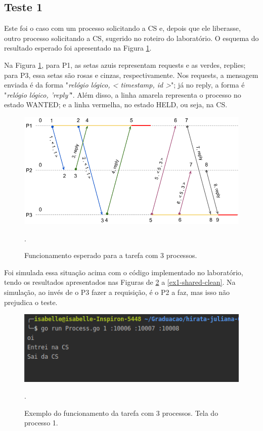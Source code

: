 \documentclass[conference]{IEEEtran}
\begin{document}
\subsection{Teste 1}

	Este foi o caso com um processo solicitando a CS e, depois que ele liberasse, outro processo solicitando a CS, sugerido no roteiro do laboratório. O esquema do resultado esperado foi apresentado na Figura \ref{ex1}.
	
	Na Figura \ref{ex1}, para P1, as setas azuis representam requests e as verdes, replies; para P3, essa setas são rosas e cinzas, respectivamente. Nos requests, a mensagem enviada é da forma "\textit{relógio lógico, < timestamp, id >}"; já no reply, a forma é "\textit{relógio lógico, 'reply'}". Além disso, a linha amarela representa o processo no estado WANTED; e a linha vermelha, no estado HELD, ou seja, na CS.
	
\begin{figure}[H]
\centering
\centerline{\includegraphics[scale=0.3]{imagens/ex1.png}}
\caption{Funcionamento esperado para a tarefa com 3 processos.}.
\label{ex1}
\end{figure}

	Foi simulada essa situação acima com o código implementado no laboratório, tendo os resultados apresentados nas Figuras de \ref{ex1-proc1-clean} a \ref{ex1-shared-clean}. Na simulação, ao invés de o P3 fazer a requisição, é o P2 a faz, mas isso não prejudica o teste.
	
\begin{figure}[H]
\centering
\centerline{\includegraphics[scale=0.5]{imagens/ex1-proc1-clean.png}}
\caption{Exemplo do funcionamento da tarefa com 3 processos. Tela do processo 1.}.
\label{ex1-proc1-clean}
\end{figure}
\end{document}
